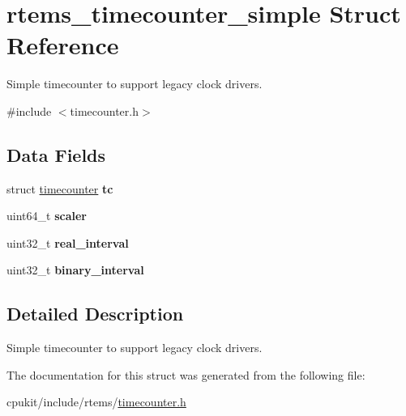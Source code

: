 \hypertarget{structrtems__timecounter__simple}{}\section{rtems\+\_\+timecounter\+\_\+simple Struct Reference}
\label{structrtems__timecounter__simple}


Simple timecounter to support legacy clock drivers.  




{\ttfamily \#include $<$timecounter.\+h$>$}

\subsection*{Data Fields}
\begin{DoxyCompactItemize}
\item 
\mbox{\label{structrtems__timecounter__simple_a18dcae8215e1fd8d65ea5ce73942cddf}} 
struct \mbox{\hyperlink{structtimecounter}{timecounter}} {\bfseries tc}
\item 
\mbox{\label{structrtems__timecounter__simple_a9fe9e7987dbace6eca1748614b5d0ea9}} 
uint64\+\_\+t {\bfseries scaler}
\item 
\mbox{\label{structrtems__timecounter__simple_a584a3a4d15128d37c55f9abaa64f65d0}} 
uint32\+\_\+t {\bfseries real\+\_\+interval}
\item 
\mbox{\label{structrtems__timecounter__simple_a0d02f6d2e798e4b0d83cba552fe21284}} 
uint32\+\_\+t {\bfseries binary\+\_\+interval}
\end{DoxyCompactItemize}


\subsection{Detailed Description}
Simple timecounter to support legacy clock drivers. 

The documentation for this struct was generated from the following file\+:\begin{DoxyCompactItemize}
\item 
cpukit/include/rtems/\mbox{\hyperlink{timecounter_8h}{timecounter.\+h}}\end{DoxyCompactItemize}

